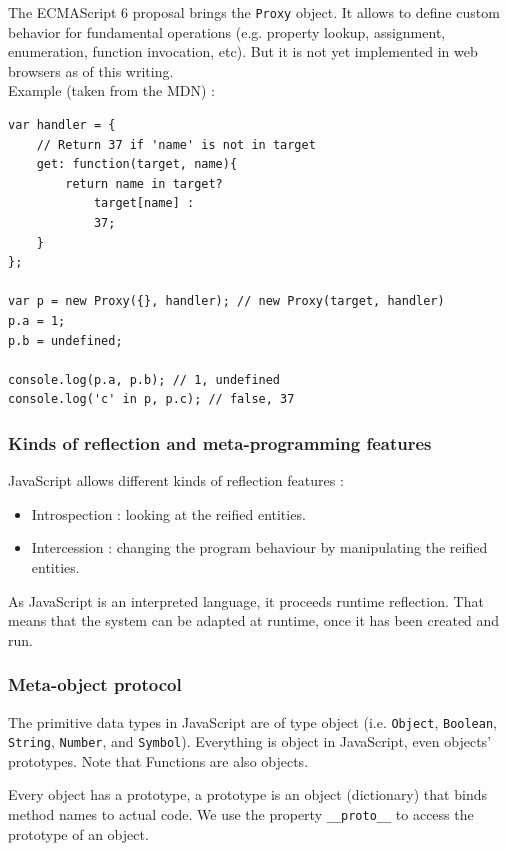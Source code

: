 \documentclass[a4paper,10pt]{article}
\begin{document}
The ECMAScript 6 proposal brings the \lstinline|Proxy| object.
It allows to define custom behavior for fundamental operations (e.g. property lookup, assignment, enumeration, function invocation, etc).
But it is not yet implemented in web browsers as of this writing. \\
Example (taken from the MDN) : \\
\begin{lstlisting}
var handler = {
    // Return 37 if 'name' is not in target
    get: function(target, name){
        return name in target?
            target[name] :
            37;
    }
};

var p = new Proxy({}, handler); // new Proxy(target, handler)
p.a = 1;
p.b = undefined;

console.log(p.a, p.b); // 1, undefined
console.log('c' in p, p.c); // false, 37
\end{lstlisting}



\subsubsection{Kinds of reflection and meta-programming features}

JavaScript allows different kinds of reflection features :
\begin{itemize}
    \item Introspection : looking at the reified entities.
    \item Intercession : changing the program behaviour by manipulating the reified entities.
\end{itemize}

As JavaScript is an interpreted language, it proceeds runtime reflection.
That means that the system can be adapted at runtime, once it has been created and run.



\subsubsection{Meta-object protocol}

The primitive data types in JavaScript are of type object (i.e. \lstinline|Object|, \mbox{\lstinline|Boolean|,} \lstinline|String|, \lstinline|Number|, and \lstinline|Symbol|).
Everything is object in JavaScript, even objects’ prototypes.
Note that Functions are also objects.

Every object has a prototype, a prototype is an object (dictionary) that binds method names to actual code.
We use the property \lstinline|__proto__| to access the prototype of an object.
\end{document}
